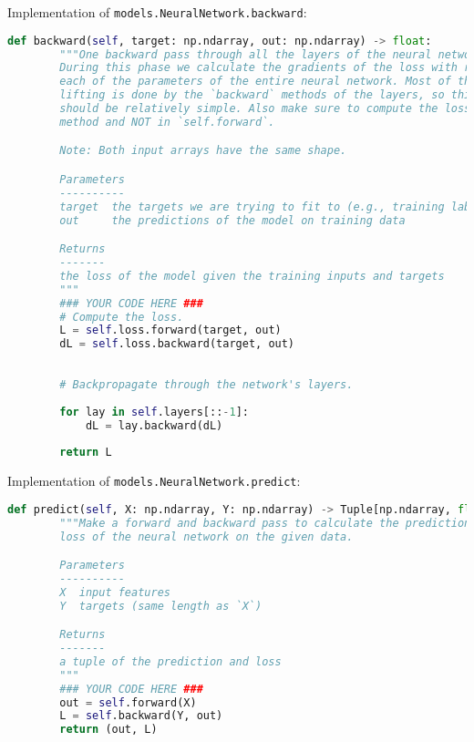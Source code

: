 Implementation of \texttt{models.NeuralNetwork.backward}:

\begin{lstlisting}[language=Python]
    def backward(self, target: np.ndarray, out: np.ndarray) -> float:
        """One backward pass through all the layers of the neural network.
        During this phase we calculate the gradients of the loss with respect to
        each of the parameters of the entire neural network. Most of the heavy
        lifting is done by the `backward` methods of the layers, so this method
        should be relatively simple. Also make sure to compute the loss in this
        method and NOT in `self.forward`.

        Note: Both input arrays have the same shape.

        Parameters
        ----------
        target  the targets we are trying to fit to (e.g., training labels)
        out     the predictions of the model on training data

        Returns
        -------
        the loss of the model given the training inputs and targets
        """
        ### YOUR CODE HERE ###
        # Compute the loss.
        L = self.loss.forward(target, out)
        dL = self.loss.backward(target, out)
        
        
        # Backpropagate through the network's layers.
        
        for lay in self.layers[::-1]:
            dL = lay.backward(dL)
        
        return L

\end{lstlisting}

Implementation of \texttt{models.NeuralNetwork.predict}:

\begin{lstlisting}[language=Python]
    def predict(self, X: np.ndarray, Y: np.ndarray) -> Tuple[np.ndarray, float]:
        """Make a forward and backward pass to calculate the predictions and
        loss of the neural network on the given data.

        Parameters
        ----------
        X  input features
        Y  targets (same length as `X`)

        Returns
        -------
        a tuple of the prediction and loss
        """
        ### YOUR CODE HERE ###
        out = self.forward(X)
        L = self.backward(Y, out)
        return (out, L)

\end{lstlisting}

